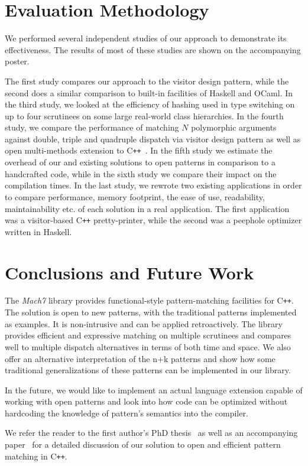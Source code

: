 \documentclass[10pt]{sigplanconf}
\DeclareRobustCommand{\Cpp}{C\texttt{++}}
\begin{document}
\section{Evaluation Methodology} %
\label{sec:eval}

We performed several independent studies of our approach to demonstrate its 
effectiveness. The results of most of these studies are shown on the 
accompanying poster.

The first study compares our approach to the visitor design pattern, while the 
second does a similar comparison to built-in facilities of Haskell and OCaml. In 
the third study, we looked at the efficiency of hashing used in type switching 
on up to four scrutinees on some large real-world class hierarchies. In the 
fourth study, we compare the performance of matching $N$ polymorphic arguments 
against double, triple and quadruple dispatch via visitor design pattern as well 
as open multi-methods extension to \Cpp{}~\cite{OpenMM}.
In the fifth study we estimate the overhead of our and existing solutions to 
open patterns in comparison to a handcrafted code, while in the sixth study we 
compare their impact on the compilation times. In the last study, we rewrote two 
existing applications in order to compare performance, memory footprint, the 
ease of use, readability, maintainability etc. of each solution in a real 
application. The first application was a visitor-based \Cpp{} pretty-printer, 
while the second was a peephole optimizer written in Haskell.

\section{Conclusions and Future Work} %
\label{sec:cc}

The \emph{Mach7} library provides functional-style pattern-matching facilities 
for \Cpp{}. The solution is open to new patterns, with the traditional patterns 
implemented as examples. It is non-intrusive and can be applied retroactively. 
The library provides efficient and expressive matching on multiple scrutinees and 
compares well to multiple dispatch alternatives in terms of both time and space.
We also offer an alternative interpretation of the n+k patterns and show how some 
traditional generalizations of these patterns can be implemented in our library. 

In the future, we would like to implement an actual language extension capable of 
working with open patterns and look into how code can be optimized without 
hardcoding the knowledge of pattern's semantics into the compiler. 

We refer the reader to the first author's PhD thesis~\cite{SolodkyyThesis} as 
well as an accompanying paper~\cite{OPM13} for a detailed discussion of our 
solution to open and efficient pattern matching in \Cpp{}.


%

\end{document}
